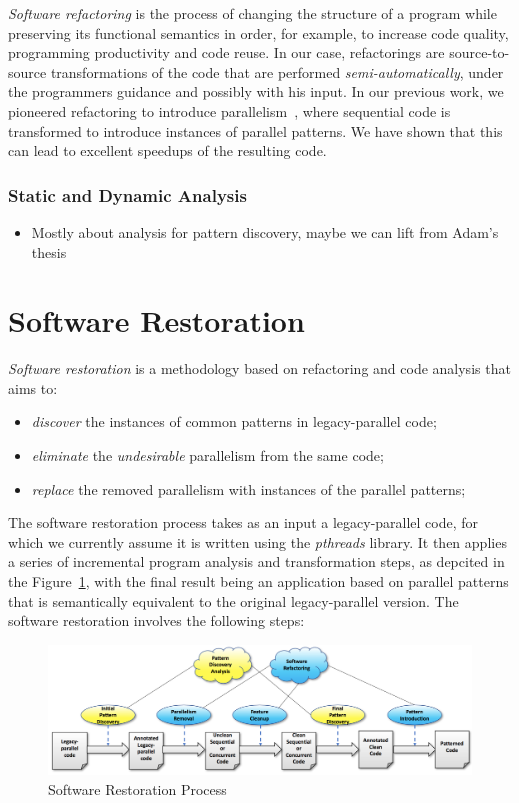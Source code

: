 \noindent
\emph{Software refactoring} is the process of changing the structure of a program while preserving
its functional semantics in order, for example, to increase code quality, programming
productivity and code reuse. In our case, refactorings are source-to-source transformations of the code that are performed \emph{semi-automatically}, under the programmers guidance and possibly with his input. In our previous work, we pioneered refactoring to introduce parallelism~\cite{rpl}, where sequential code is transformed to introduce instances of parallel patterns. We have shown that this can lead to excellent speedups of the resulting code.

\subsubsection*{Static and Dynamic Analysis}
\begin{itemize}
\item Mostly about analysis for pattern discovery, maybe we can lift from Adam's thesis
\end{itemize}

\section{Software Restoration}
\noindent
\emph{Software restoration} is a methodology based on refactoring and code analysis that aims to:
\begin{itemize}
\item \emph{discover} the instances of common patterns in legacy-parallel code;
\item \emph{eliminate} the \emph{undesirable} parallelism from the same code;
\item \emph{replace} the removed parallelism with instances of the parallel patterns;
\end{itemize}
The software restoration process takes as an input a legacy-parallel code, for which we currently assume it is written using the \emph{pthreads} library. It then applies a series of incremental program analysis and transformation steps, as depcited in the Figure~\ref{fig:SoftRest}, with the final result being an application based on parallel patterns that is semantically equivalent to the original legacy-parallel version. The software restoration involves the following steps:

\begin{figure}
\centering
\includegraphics[width=\textwidth]{images/SoftRest.png}
\caption{Software Restoration Process}
\label{fig:SoftRest}
\end{figure}

